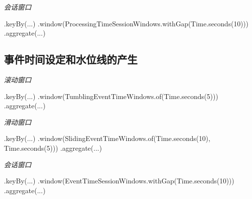 \documentclass[cn,11pt,chinese]{elegantbook}
\newenvironment{Shaded}{}{}
\newcommand{\BuiltInTok}[1]{#1}
\newcommand{\DecValTok}[1]{\textcolor[rgb]{0.25,0.63,0.44}{#1}}
\newcommand{\FunctionTok}[1]{\textcolor[rgb]{0.02,0.16,0.49}{#1}}
\newcommand{\NormalTok}[1]{#1}
\begin{document}
\emph{会话窗口}

\begin{Shaded}
\begin{Highlighting}[]
\NormalTok{.}\FunctionTok{keyBy}\NormalTok{(...)}
\NormalTok{.}\FunctionTok{window}\NormalTok{(ProcessingTimeSessionWindows.}\FunctionTok{withGap}\NormalTok{(}\BuiltInTok{Time}\NormalTok{.}\FunctionTok{seconds}\NormalTok{(}\DecValTok{10}\NormalTok{)))}
\NormalTok{.}\FunctionTok{aggregate}\NormalTok{(...)}
\end{Highlighting}
\end{Shaded}

\hypertarget{ux4e8bux4ef6ux65f6ux95f4ux8bbeux5b9aux548cux6c34ux4f4dux7ebfux7684ux4ea7ux751f}{%
\subsection{事件时间设定和水位线的产生}\label{ux4e8bux4ef6ux65f6ux95f4ux8bbeux5b9aux548cux6c34ux4f4dux7ebfux7684ux4ea7ux751f}}

\emph{滚动窗口}

\begin{Shaded}
\begin{Highlighting}[]
\NormalTok{.}\FunctionTok{keyBy}\NormalTok{(...)}
\NormalTok{.}\FunctionTok{window}\NormalTok{(TumblingEventTimeWindows.}\FunctionTok{of}\NormalTok{(}\BuiltInTok{Time}\NormalTok{.}\FunctionTok{seconds}\NormalTok{(}\DecValTok{5}\NormalTok{)))}
\NormalTok{.}\FunctionTok{aggregate}\NormalTok{(...)}
\end{Highlighting}
\end{Shaded}

\emph{滑动窗口}

\begin{Shaded}
\begin{Highlighting}[]
\NormalTok{.}\FunctionTok{keyBy}\NormalTok{(...)}
\NormalTok{.}\FunctionTok{window}\NormalTok{(SlidingEventTimeWindows.}\FunctionTok{of}\NormalTok{(}\BuiltInTok{Time}\NormalTok{.}\FunctionTok{seconds}\NormalTok{(}\DecValTok{10}\NormalTok{), }\BuiltInTok{Time}\NormalTok{.}\FunctionTok{seconds}\NormalTok{(}\DecValTok{5}\NormalTok{)))}
\NormalTok{.}\FunctionTok{aggregate}\NormalTok{(...)}
\end{Highlighting}
\end{Shaded}

\emph{会话窗口}

\begin{Shaded}
\begin{Highlighting}[]
\NormalTok{.}\FunctionTok{keyBy}\NormalTok{(...)}
\NormalTok{.}\FunctionTok{window}\NormalTok{(EventTimeSessionWindows.}\FunctionTok{withGap}\NormalTok{(}\BuiltInTok{Time}\NormalTok{.}\FunctionTok{seconds}\NormalTok{(}\DecValTok{10}\NormalTok{)))}
\NormalTok{.}\FunctionTok{aggregate}\NormalTok{(...)}
\end{Highlighting}
\end{Shaded}
\end{document}
